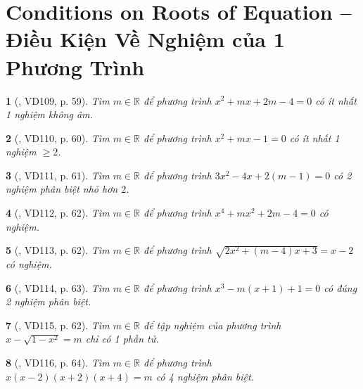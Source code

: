 \documentclass{article}
\newtheorem{baitoan}{}
\begin{document}

\section{Conditions on Roots of Equation -- Điều Kiện Về Nghiệm của 1 Phương Trình}

\begin{baitoan}[\cite{Binh_Toan_9_tap_2}, VD109, p. 59]
	Tìm $m\in\mathbb{R}$ để phương trình $x^2 + mx + 2m - 4 = 0$ có ít nhất 1 nghiệm không âm.
\end{baitoan}

\begin{baitoan}[\cite{Binh_Toan_9_tap_2}, VD110, p. 60]
	Tìm $m\in\mathbb{R}$ để phương trình $x^2 + mx - 1 = 0$ có ít nhất 1 nghiệm $\ge2$.
\end{baitoan}

\begin{baitoan}[\cite{Binh_Toan_9_tap_2}, VD111, p. 61]
	Tìm $m\in\mathbb{R}$ để phương trình $3x^2 - 4x + 2(m - 1) = 0$ có 2 nghiệm phân biệt nhỏ hơn $2$.
\end{baitoan}

\begin{baitoan}[\cite{Binh_Toan_9_tap_2}, VD112, p. 62]
	Tìm $m\in\mathbb{R}$ để phương trình $x^4 + mx^2 + 2m - 4 = 0$ có nghiệm.
\end{baitoan}

\begin{baitoan}[\cite{Binh_Toan_9_tap_2}, VD113, p. 62]
	Tìm $m\in\mathbb{R}$ để phương trình $\sqrt{2x^2 + (m - 4)x + 3} = x - 2$ có nghiệm.
\end{baitoan}

\begin{baitoan}[\cite{Binh_Toan_9_tap_2}, VD114, p. 63]
	Tìm $m\in\mathbb{R}$ để phương trình $x^3 - m(x + 1) + 1 = 0$ có đúng 2 nghiệm phân biệt.
\end{baitoan}

\begin{baitoan}[\cite{Binh_Toan_9_tap_2}, VD115, p. 62]
	Tìm $m\in\mathbb{R}$ để tập nghiệm của phương trình $x - \sqrt{1 - x^2} = m$ chỉ có 1 phần tử.
\end{baitoan}

\begin{baitoan}[\cite{Binh_Toan_9_tap_2}, VD116, p. 64]
	Tìm $m\in\mathbb{R}$ để phương trình $x(x - 2)(x + 2)(x + 4) = m$ có 4 nghiệm phân biệt.
\end{baitoan}
\end{document}
